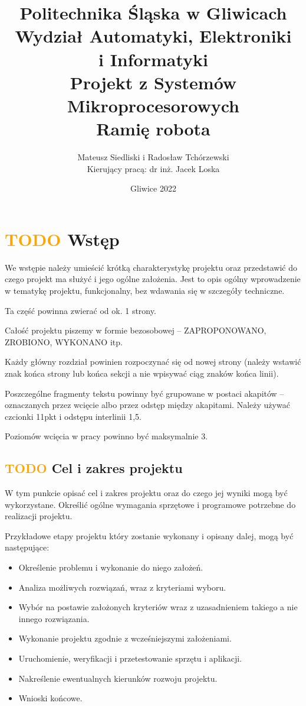 \documentclass[11pt,titlepage]{article}
\title{
\textbf{Politechnika Śląska w Gliwicach\\
Wydział Automatyki, Elektroniki\\
i Informatyki}\\
\vspace*{1cm}
Projekt z Systemów Mikroprocesorowych\\
Ramię robota\\
}
\author{Mateusz Siedliski i Radosław Tchórzewski\\
Kierujący pracą: dr inż. Jacek Loska}
\date{Gliwice 2022}
\begin{document}
\maketitle

\tableofcontents

\newpage

\section{\textcolor{orange}{TODO} Wstęp}

We wstępie należy umieścić krótką charakterystykę projektu oraz przedstawić do czego projekt ma służyć i jego ogólne założenia. Jest to opis ogólny wprowadzenie w tematykę projektu, funkcjonalny, bez wdawania się w szczegóły techniczne.

Ta część powinna zwierać od ok. 1 strony.

Całość projektu piszemy w formie bezosobowej – ZAPROPONOWANO, ZROBIONO, WYKONANO itp.

Każdy główny rozdział powinien rozpoczynać się od nowej strony (należy wstawić znak końca strony lub końca sekcji a nie wpisywać ciąg znaków końca linii).

Poszczególne fragmenty tekstu powinny być grupowane w postaci akapitów – oznaczanych przez wcięcie albo przez odstęp między akapitami. Należy używać czcionki 11pkt i odstępu interlinii 1,5.

Poziomów wcięcia w pracy powinno być maksymalnie 3.

\subsection{\textcolor{orange}{TODO} Cel i zakres projektu}

W tym punkcie opisać cel i zakres projektu oraz do czego jej wyniki mogą być wykorzystane. Określić ogólne wymagania sprzętowe i programowe potrzebne do realizacji projektu.

Przykładowe etapy projektu który zostanie wykonany i opisany dalej, mogą być następujące:
\begin{itemize}
    \item Określenie problemu i wykonanie do niego założeń.
    \item Analiza możliwych rozwiązań, wraz z kryteriami wyboru.
    \item Wybór na postawie założonych kryteriów wraz z uzasadnieniem takiego a nie innego rozwiązania.
    \item Wykonanie projektu zgodnie z wcześniejszymi założeniami.
    \item Uruchomienie, weryfikacji i przetestowanie sprzętu i aplikacji.
    \item Nakreślenie ewentualnych kierunków rozwoju projektu.
    \item Wnioski końcowe.
\end{itemize}
\end{document}
